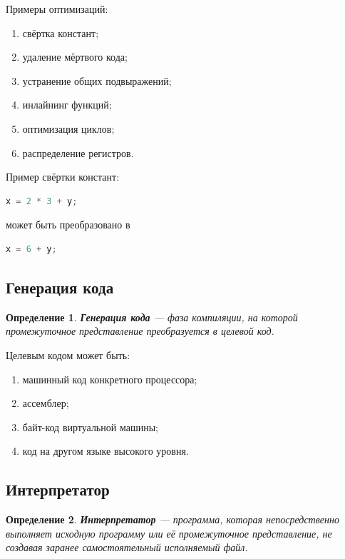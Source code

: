 \documentclass[12pt,a4paper]{article}
\newtheorem{definition}{Определение}
\begin{document}
Примеры оптимизаций:
\begin{enumerate}
  \item свёртка констант;
  \item удаление мёртвого кода;
  \item устранение общих подвыражений;
  \item инлайнинг функций;
  \item оптимизация циклов;
  \item распределение регистров.
\end{enumerate}

Пример свёртки констант:

\begin{lstlisting}[language=C]
x = 2 * 3 + y;
\end{lstlisting}

может быть преобразовано в

\begin{lstlisting}[language=C]
x = 6 + y;
\end{lstlisting}

\subsection{Генерация кода}

\begin{definition}
\textbf{Генерация кода} --- фаза компиляции, на которой промежуточное представление преобразуется в целевой код.
\end{definition}

Целевым кодом может быть:
\begin{enumerate}
  \item машинный код конкретного процессора;
  \item ассемблер;
  \item байт-код виртуальной машины;
  \item код на другом языке высокого уровня.
\end{enumerate}

\subsection{Интерпретатор}

\begin{definition}
\textbf{Интерпретатор} --- программа, которая непосредственно выполняет исходную программу или её промежуточное представление, не создавая заранее самостоятельный исполняемый файл.
\end{definition}
\end{document}
